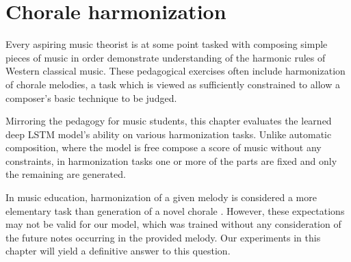 \chapter{Chorale harmonization}\label{ch:harmonization}

\ifpdf
    \graphicspath{{Chapter6/Figs/Raster/}{Chapter6/Figs/PDF/}{Chapter6/Figs/}}
\else
    \graphicspath{{Chapter6/Figs/Vector/}{Chapter6/Figs/}}
\fi

Every aspiring music theorist is at some point tasked with composing simple
pieces of music in order demonstrate understanding of the harmonic rules of
Western classical music. These pedagogical exercises often include
harmonization of chorale melodies, a task which is viewed as sufficiently
constrained to allow a composer's basic technique to be judged.

Mirroring the pedagogy for music students, this chapter evaluates the learned
deep LSTM model's ability on various harmonization tasks. Unlike automatic
composition, where the model is free compose a score of music without any
constraints, in harmonization tasks one or more of the parts are fixed and only
the remaining are generated.

In music education, harmonization of a given melody is considered a more
elementary task than generation of a novel chorale
\citep{denny1960oxford,piston1978harmony}. However, these expectations may not
be valid for our model, which was trained without any consideration of the
future notes occurring in the provided melody. Our experiments in this chapter
will yield a definitive answer to this question.





